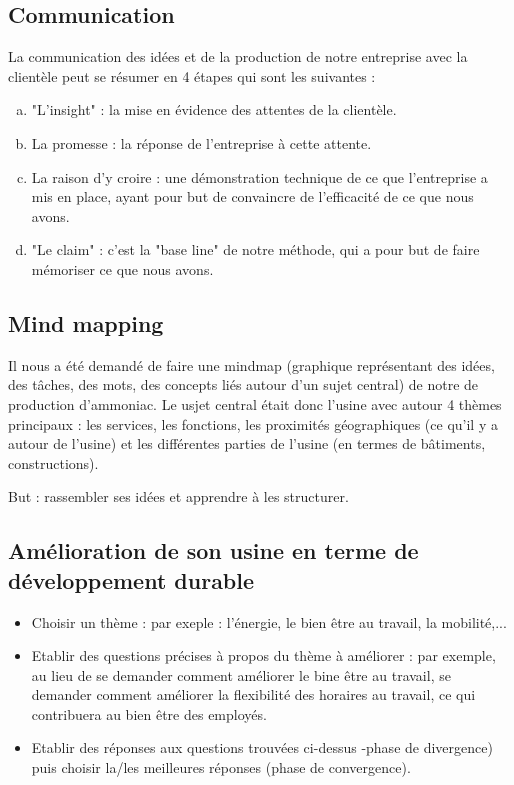 \subsection{Communication}
La communication des idées et de la production de notre entreprise avec la clientèle peut se résumer 
en 4 étapes qui sont les suivantes :
\begin{enumerate}[(a)]
\item "L'insight" : la mise en évidence des attentes de la clientèle.
\item La promesse : la réponse de l'entreprise à cette attente.
\item La raison d'y croire : une démonstration technique de ce que l'entreprise a mis en place, 
ayant pour but de convaincre de l'efficacité de ce que nous avons.
\item "Le claim" : c'est la "base line" de notre méthode, qui a pour but de faire mémoriser ce que nous avons.
\end{enumerate}
\subsection{Mind mapping}
Il nous a été demandé de faire une mindmap (graphique représentant des idées, des tâches, des mots, 
des concepts liés autour d'un sujet central) de notre de production d'ammoniac.
Le usjet central était donc l'usine avec autour 4 thèmes principaux : les services, les fonctions, 
les proximités géographiques (ce qu'il y a autour de l'usine) et les différentes parties de l'usine 
(en termes de bâtiments, constructions).

But : rassembler ses idées et apprendre à les structurer.
\subsection{Amélioration de son usine en terme de développement durable}
\begin{itemize}
\item Choisir un thème : par exeple : l'énergie, le bien être au travail, la mobilité,...
\item Etablir des questions précises à propos du thème à améliorer : par exemple, au lieu de se 
demander comment améliorer le bine être au travail, se demander comment améliorer la flexibilité 
des horaires au travail, ce qui contribuera au bien être des employés.
\item Etablir des réponses aux questions trouvées ci-dessus -phase de divergence) puis choisir 
la/les meilleures réponses (phase de convergence).
\end{itemize}

